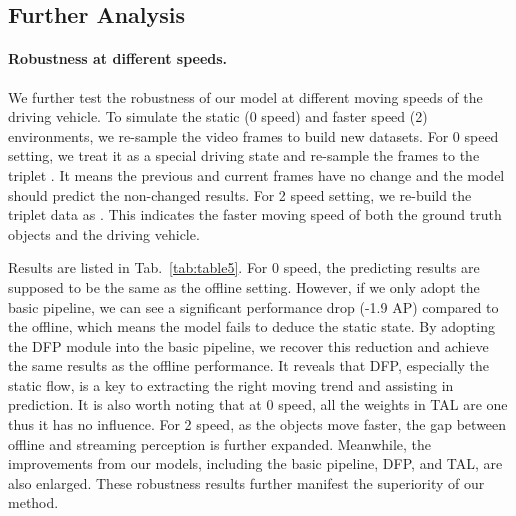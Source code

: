 \documentclass[10pt,twocolumn,letterpaper]{article}
\begin{document}
\subsection{Further Analysis}
\paragraph{Robustness at different speeds.}
We further test the robustness of our model at different moving speeds of the driving vehicle. To simulate the static (0 speed) and faster speed (2) environments, we re-sample the video frames to build new datasets. For 0 speed setting, we treat it as a special driving state and re-sample the frames to the triplet . It means the previous and current frames have no change and the model should predict the non-changed results.
For 2 speed setting, we re-build the triplet data as  . This indicates the faster moving speed of both the ground truth objects and the driving vehicle. 

Results are listed in Tab.~\ref{tab:table5}. For 0 speed, the predicting results are supposed to be the same as the offline setting. However, if we only adopt the basic pipeline, we can see a significant performance drop (-1.9 AP) compared to the offline, which means the model fails to deduce the static state. By adopting the DFP module into the basic pipeline, we recover this reduction and achieve the same results as the offline performance. It reveals that DFP, especially the static flow, is a key to extracting the right moving trend and assisting in prediction. It is also worth noting that at 0 speed, all the weights in TAL are one thus it has no influence. For 2 speed, as the objects move faster, the gap between offline and streaming perception is further expanded. Meanwhile, the improvements from our models, including the basic pipeline, DFP, and TAL, are also enlarged. These robustness results further manifest the superiority of our method.  

\begin{table}[t]
\centering
{} \caption{Results on different moving speed settings. The 0 static setting actually equals to the offline setting. Subscripts indicate different moving speeds.} \label{tab:table5}
\end{table}
\end{document}
